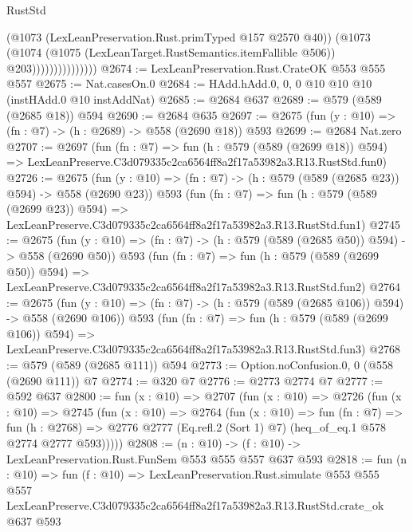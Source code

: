 \begin{lexlean}{RustStd}
\begin{coremodule}
                              (@1073 (LexLeanPreservation.Rust.primTyped @157 @2570 @40))
                              (@1073
                                (@1074
                                  (@1075 (LexLeanTarget.RustSemantics.itemFallible @506))
                                  @203)))))))))))))))
@2674 := LexLeanPreservation.Rust.CrateOK @553 @555 @557
@2675 := Nat.casesOn.{0}
@2684 := HAdd.hAdd.{0, 0, 0} @10 @10 @10 (instHAdd.{0} @10 instAddNat)
@2685 := @2684 @637
@2689 := @579 (@589 (@2685 @18)) @594
@2690 := @2684 @635
@2697 := @2675 (fun (y : @10) => (fn : @7) -> (h : @2689) -> @558 (@2690 @18)) @593
@2699 := @2684 Nat.zero
@2707 := @2697
    (fun (fn : @7) =>
    fun (h : @579 (@589 (@2699 @18)) @594) =>
    LexLeanPreserve.C3d079335c2ca6564ff8a2f17a53982a3.R13.RustStd.fun0)
@2726 := @2675
    (fun (y : @10) => (fn : @7) -> (h : @579 (@589 (@2685 @23)) @594) -> @558 (@2690 @23))
    @593
    (fun (fn : @7) =>
    fun (h : @579 (@589 (@2699 @23)) @594) =>
    LexLeanPreserve.C3d079335c2ca6564ff8a2f17a53982a3.R13.RustStd.fun1)
@2745 := @2675
    (fun (y : @10) => (fn : @7) -> (h : @579 (@589 (@2685 @50)) @594) -> @558 (@2690 @50))
    @593
    (fun (fn : @7) =>
    fun (h : @579 (@589 (@2699 @50)) @594) =>
    LexLeanPreserve.C3d079335c2ca6564ff8a2f17a53982a3.R13.RustStd.fun2)
@2764 := @2675
    (fun (y : @10) => (fn : @7) -> (h : @579 (@589 (@2685 @106)) @594) -> @558 (@2690 @106))
    @593
    (fun (fn : @7) =>
    fun (h : @579 (@589 (@2699 @106)) @594) =>
    LexLeanPreserve.C3d079335c2ca6564ff8a2f17a53982a3.R13.RustStd.fun3)
@2768 := @579 (@589 (@2685 @111)) @594
@2773 := Option.noConfusion.{0, 0} (@558 (@2690 @111)) @7
@2774 := @320 @7
@2776 := @2773 @2774 @7
@2777 := @592 @637
@2800 := fun (x : @10) =>
  @2707
    (fun (x : @10) =>
    @2726
      (fun (x : @10) =>
      @2745
        (fun (x : @10) =>
        @2764
          (fun (x : @10) =>
          fun (fn : @7) =>
          fun (h : @2768) =>
          @2776 @2777 (Eq.refl.{2} (Sort 1) @7) (heq_of_eq.{1} @578 @2774 @2777 @593)))))
@2808 := (n : @10) -> (f : @10) -> LexLeanPreservation.Rust.FunSem @553 @555 @557 @637 @593
@2818 := fun (n : @10) =>
  fun (f : @10) =>
  LexLeanPreservation.Rust.simulate
    @553
    @555
    @557
    LexLeanPreserve.C3d079335c2ca6564ff8a2f17a53982a3.R13.RustStd.crate_ok
    @637
    @593
\end{coremodule}
\end{lexlean}
